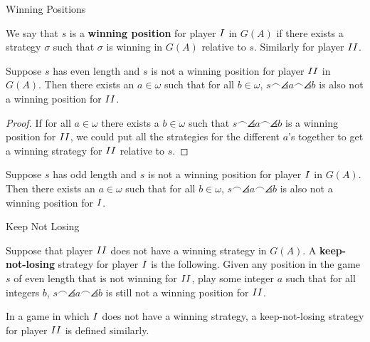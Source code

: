 \documentclass[pdf,final]{prosper}
\newcommand{\skipsmall}{\vspace{1em}}
\begin{document}
\begin{slide}{Winning Positions}

\begin{definition}
We say that $s$ is a \textbf{winning position} for player $I$ in $G(A)$ if
there exists a strategy $\sigma$ such that $\sigma$ is winning in $G(A)$
relative to $s$. Similarly for player $II$.
\end{definition}

\skipsmall

\begin{lemma}
Suppose $s$ has even length and $s$ is not a winning position for
player $II$ in $G(A)$. Then there exists an $a\in\omega$ such that for all
$b\in\omega$,
$s\frown\angles{a}\frown\angles{b}$ is also not a winning position for $II$.
\end{lemma}
\begin{proof}
If for all $a\in\omega$ there exists a $b\in\omega$ such that
$s\frown\angles{a}\frown\angles{b}$ is a winning position for $II$, we could
put all the strategies for the different $a$'s together to get a winning
strategy for $II$ relative to $s$.
\end{proof}

\skipsmall

\begin{lemma}
Suppose $s$ has odd length and $s$ is not a winning position for
player $I$ in $G(A)$. Then there exists an $a\in\omega$ such that for all
$b\in\omega$,
$s\frown\angles{a}\frown\angles{b}$ is also not a winning position for $I$.
\end{lemma}
\end{slide}

\begin{slide}{Keep Not Losing}
\begin{definition}
Suppose that player $II$ does not have a winning strategy in $G(A)$. A
\textbf{keep-not-losing} strategy for player $I$ is the following. Given any
position in the game $s$ of even length that is not winning for $II$, play
some integer $a$ such that for all integers $b$,
$s\frown\angles{a}\frown\angles{b}$ is still not a winning position for $II$.

\skipsmall

In a game in which $I$ does not have a winning strategy, a keep-not-losing
strategy for player $II$ is defined similarly.
\end{definition}

\end{slide}
\end{document}
